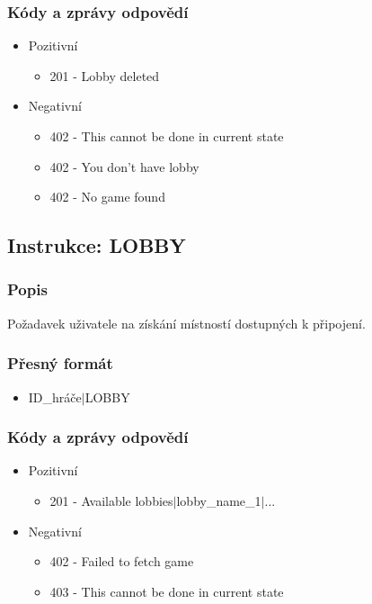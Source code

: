 \documentclass[12pt]{report}
\begin{document}
\subsubsection{Kódy a zprávy odpovědí}
\begin{itemize}
	\item Pozitivní
		\begin{itemize}
			\item 201 - Lobby deleted
		\end{itemize}
	\item Negativní
		\begin{itemize}
			\item 402 - This cannot be done in current state
			\item 402 - You don't have lobby
			\item 402 - No game found
		\end{itemize}
\end{itemize}
%
%
%
\subsection{Instrukce: LOBBY}
\subsubsection{Popis}
Požadavek uživatele na získání místností dostupných k připojení.

\subsubsection{Přesný formát}
\begin{itemize}
	\item ID\_hráče$|$LOBBY
\end{itemize}

\subsubsection{Kódy a zprávy odpovědí}
\begin{itemize}
	\item Pozitivní
		\begin{itemize}
			\item 201 - Available lobbies$|$lobby\_name\_1$|$...
		\end{itemize}
	\item Negativní
		\begin{itemize}
			\item 402 - Failed to fetch game
			\item 403 - This cannot be done in current state
		\end{itemize}
\end{itemize}
%
%
%
\end{document}
